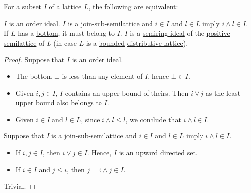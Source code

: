 \begin{proposition}\label{thm:lattice_ideals}
  For a subset \( I \) of a \hyperref[def:lattice]{lattice} \( L \), the following are equivalent:
  \begin{thmenum}
     \( I \) is an \hyperref[def:order_ideal_and_filter]{order ideal}.
     \( I \) is a \hyperref[def:semilattice/submodel]{join-sub-semilattice} and \( i \in I \) and \( l \in L \) imply \( i \wedge l \in I \). If \( L \) has a \hyperref[def:partially_ordered_set_extremal_points/top_and_bottom]{bottom}, it must belong to \( I \).
     \( I \) is a \hyperref[def:semiring_ideal]{semiring ideal} of the \hyperref[ex:def:semiring/lattice]{positive semilattice} of \( L \) (in case \( L \) is a \hyperref[def:semilattice/bounded]{bounded} \hyperref[def:semilattice/distributive_lattice]{distributive lattice}).
  \end{thmenum}
\end{proposition}
\begin{proof}
   Suppose that \( I \) is an order ideal.
  \begin{itemize}
    \item The bottom \( \bot \) is less than any element of \( I \), hence \( \bot \in I \).
    \item Given \( i, j \in I \), \( I \) contains an upper bound of theirs. Then \( i \vee j \) as the least upper bound also belongs to \( I \).
    \item Given \( i \in I \) and \( l \in L \), since \( i \wedge l \leq l \), we conclude that \( i \wedge l \in I \).
  \end{itemize}

   Suppose that \( I \) is a join-sub-semilattice and \( i \in I \) and \( l \in L \) imply \( i \wedge l \in I \).
  \begin{itemize}
    \item If \( i, j \in I \), then \( i \vee j \in I \). Hence, \( I \) is an upward directed set.
    \item If \( i \in I \) and \( j \leq i \), then \( j = i \wedge j \in I \).
  \end{itemize}

   Trivial.
\end{proof}

